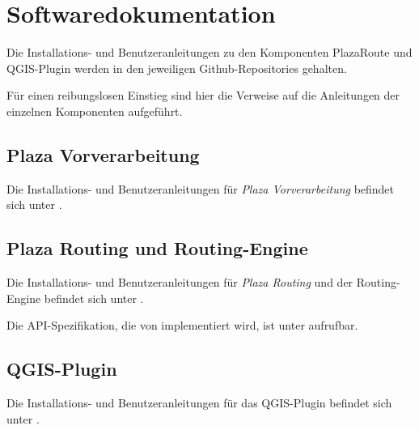 \section{Softwaredokumentation}
\label{sec:Softwaredokumentation}

Die Installations- und Benutzeranleitungen zu den Komponenten PlazaRoute und \gls{QGIS}-Plugin werden in den jeweiligen Github-Repositories \cite{github:PlazaRoute} \cite{github:PlazaRoute-qgis-plugin} gehalten. 

Für einen reibungslosen Einstieg sind hier die Verweise auf die Anleitungen der einzelnen Komponenten aufgeführt.

\subsection{Plaza Vorverarbeitung}
\label{Softwaredokumentation:Plaza Vorverarbeitung}

Die Installations- und Benutzeranleitungen für \emph{Plaza Vorverarbeitung} befindet sich unter \cite{github:plaza_preprocessing_readme}.

\subsection{Plaza Routing und Routing-Engine}
\label{Softwaredokumentation:Plaza Routing}

Die Installations- und Benutzeranleitungen für \emph{Plaza Routing} und der Routing-Engine befindet sich unter \cite{github:plaza_routing_readme}.

Die \ac{API}-Spezifikation, die von  implementiert wird, ist unter \cite{plaza-routing-api-spez} aufrufbar.

\subsection{QGIS-Plugin}
\label{Softwaredokumentation:QGIS-Plugin}

Die Installations- und Benutzeranleitungen für das QGIS-Plugin befindet sich unter \cite{github:PlazaRoute-qgis-plugin}.
